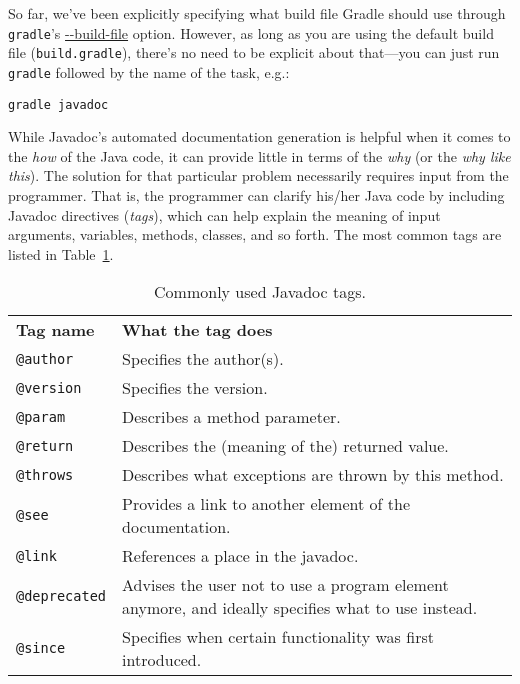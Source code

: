 So far, we've been explicitly specifying what build file Gradle should use through \texttt{gradle}'s \url{--build-file} option. However, as long as you are using the default build file (\texttt{build.gradle}), there's no need to be explicit about that---you can just run \texttt{gradle} followed by the name of the task, e.g.:
\begin{lstlisting}[style=basic,style=bash]
gradle javadoc
\end{lstlisting}

While Javadoc's automated documentation generation is helpful when it comes to the \textit{how} of the Java code, it can provide little in terms of the \textit{why} (or the \textit{why like this}). The solution for that particular problem necessarily requires input from the programmer. That is, the programmer can clarify his/her Java code by including Javadoc directives (\textit{tags}), which can help explain the meaning of input arguments, variables, methods, classes, and so forth. The most common tags are listed in Table~\ref{tab:javadoc-tags}.


\begin{table}[!ht]
\vspace{1em}
\caption{Commonly used Javadoc tags.\label{tab:javadoc-tags}}
\begin{tabular}{lp{10cm}}
\vspace{0.5em}
\textbf{Tag name}    & \textbf{What the tag does}                                 \\
\texttt{@author}     & Specifies the author(s).                                   \\
\texttt{@version}    & Specifies the version.                                     \\
\texttt{@param}      & Describes a method parameter.                              \\
\texttt{@return}     & Describes the (meaning of the) returned value.             \\
\texttt{@throws}     & Describes what exceptions are thrown by this method.       \\
\texttt{@see}        & Provides a link to another element of the documentation.   \\
\texttt{@link}       & References a place in the javadoc.                         \\
\texttt{@deprecated} & Advises the user not to use a program element anymore, and ideally specifies what to use instead.     \\
\texttt{@since}      & Specifies when certain functionality was first introduced. \\
\end{tabular}
\end{table}

